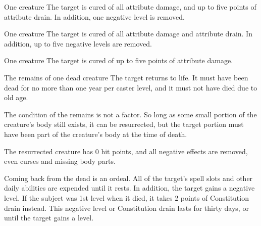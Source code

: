 \begin{spelltarget}{One creature}
    \spelleffect The target is cured of all attribute damage, and up to five points of attribute drain. In addition, one negative level is removed.
\end{spelltarget}

\begin{spelltarget}{One creature}
    \spelleffect The target is cured of all attribute damage and attribute drain. In addition, up to five negative levels are removed.
\end{spelltarget}

\begin{spelltarget}{One creature}
    \spelleffect The target is cured of up to five points of attribute damage.
\end{spelltarget}

\begin{spelltarget}{The remains of one dead creature}
    \spelleffect The target returns to life. It must have been dead for no more than one year per caster level, and it must not have died due to old age.

    The condition of the remains is not a factor. So long as some small portion of the creature's body still exists, it can be resurrected, but the target portion must have been part of the creature's body at the time of death. 

    The resurrected creature has 0 hit points, and all negative effects are removed, even curses and missing body parts.

    \par Coming back from the dead is an ordeal. All of the target's spell slots and other daily abilities are expended until it rests. In addition, the target gains a negative level. If the subject was 1st level when it died, it takes 2 points of Constitution drain instead. This negative level or Constitution drain lasts for thirty days, or until the target gains a level.
\end{spelltarget}

